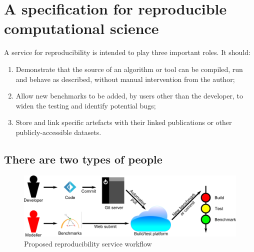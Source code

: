 \documentclass[conference]{IEEEtran}
\begin{document}
\section{A specification for reproducible computational science}\label{spec}

A service for reproducibility is intended to play three important
roles. It should:

\begin{enumerate}
\item Demonstrate that the source of an algorithm or tool can be
  compiled, run and behave as described, without manual intervention
  from the author; 
\item Allow new benchmarks to be added, by users other than
the developer, to widen the testing and identify potential bugs; 
\item Store and link specific artefacts with their linked
publications or other publicly-accessible datasets. 
\end{enumerate}

\subsection{There are two types of people}

\begin{figure}[!htp]
	\centering
	\includegraphics[width=\textwidth]{workflow}
	\caption{Proposed reproducibility service workflow}
	\label{schematic}
\end{figure}
\end{document}
